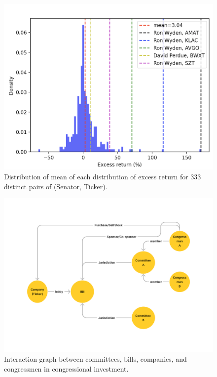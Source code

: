 \documentclass[15pt,letterpaper]{article}
\begin{document}
\begin{figure}[h]
  \centering
  \includegraphics[width=1\textwidth]{imgs/ex-r/aggregate.png}
  \caption{Distribution of mean of each distribution of excess return for $333$ distinct pairs of (Senator, Ticker).}
  \label{fig:agg-ex-r}
\end{figure}

\begin{figure}[h]
  \centering
  \includegraphics[width=1\textwidth]{imgs/cgd.png}
  \caption{Interaction graph between committees, bills, companies, and congressmen in congressional investment.}
  \label{fig:cbd}
\end{figure}
\end{document}

